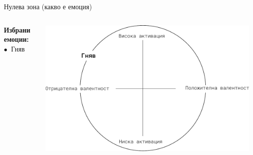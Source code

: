 \documentclass[9pt]{beamer}
\begin{document}
    \begin{frame}{Нулева зона (какво е емоция)}
        \begin{columns}[T] %
            \begin{column}{.38\textwidth}
                \textbf{Избрани емоции:}
                \vspace{1cm} \leavevmode \newline
                $\bullet\ $ Гняв
                \vspace{1cm} \leavevmode \newline
                \phantom{$\bullet\ $ Щастие}
                \vspace{1cm} \leavevmode \newline
                \phantom{$\bullet\ $ Неутрална емоция}
                \vspace{1cm} \leavevmode \newline
                \phantom{$\bullet\ $ Тъга}
            \end{column}%
            \hfill%
            \begin{column}{.60\textwidth}
                \vspace{1cm}
                \begin{center}
                    \includegraphics[width=\textwidth]{valence_arousal_a}%
                \end{center}
            \end{column}%
        \end{columns}
    \end{frame}
\end{document}
